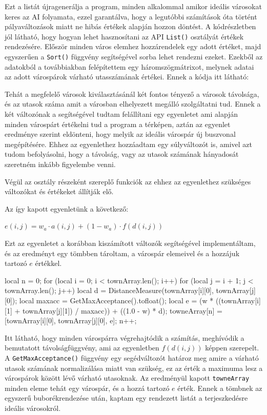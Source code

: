 Ezt a listát újragenerálja a program, minden alkalommal amikor ideális városokat keres az AI folyamata, ezzel garantálva, hogy a legutóbbi számítások óta történt pályaváltozások miatt ne hibás értékek alapján hozzon döntést. A kódrészletben jól látható, hogy hogyan lehet hasznosítani az API \texttt{List()} osztályát értékek rendezésére. Először minden város elemhez hozzárendelek egy adott értéket, majd egyszerűen a \texttt{Sort()} függvény segítségével sorba lehet rendezni ezeket. Ezekből az adatokból a továbbiakban felépítettem egy háromszögmátrixot, melynek adatai az adott várospárok várható utasszámának értékei. Ennek a kódja itt látható:

Tehát a megfelelő városok kiválasztásánál két fontos tényező a városok távolsága, és az utasok száma amit a városban elhelyezett megálló szolgáltatni tud. Ennek a két változónak a segítségével tudtam felállítani egy egyenletet ami alapján minden várospárt értékelni tud a program a térképen, aztán az egyenlet eredménye szerint eldönteni, hogy melyik az ideális várospár új buszvonal megépítésére. Ehhez az egyenlethez hozzáadtam egy súlyváltozót is, amivel azt tudom befolyásolni, hogy a távolság, vagy az utasok számának hányadosát szeretném inkább figyelembe venni.

Végül az osztály részeként szereplő funkciók az ehhez az egyenlethez szükséges változókat és értékeket állítják elő.

Az így kapott egyenletünk a következő:
\begin{center}
	$ e(i,j)=w_{a} \cdot a(i,j)+(1-w_{a}) \cdot f(d(i,j)) $
\end{center}

Ezt az egyenletet a korábban kiszámított változók segítségével implementáltam, és az eredményt egy tömbben tároltam, a várospár elemeivel és a hozzájuk tartozó $e$ értékkel.

\begin{cpp}
local n = 0;
for (local i = 0; i < townArray.len(); i++) {
  for (local j = i + 1; j < townArray.len(); j++) {
    local d = DistanceMeasure(townArray[i][0], townArray[j][0]);
    local maxacc = GetMaxAcceptance().tofloat();
    local e = (w * ((townArray[i][1] + townArray[j][1]) / maxacc))
      + ((1.0 - w) * d);
    towneArray[n] = [townArray[i][0], townArray[j][0], e];
    n++;
  }
}
\end{cpp}

Itt látható, hogy minden várospárra végrehajtódik a számítás, meghívódik a bemutatott távolságfüggvény, ami az egyenletben $f(d(i,j))$ képpen szerepelt. \\ A \texttt{GetMaxAcceptance()} függvény egy segédváltozót határoz meg amire a várható utasok számának normalizálása miatt van szükség, ez az érték a maximuma lesz a várospárok között lévő várható utasoknak. Az eredményül kapott \texttt{towneArray} minden eleme tehát egy várospár, és a hozzá tartozó $e$ érték. Ennek a tömbnek az egyszerű buborékrendezése után, kaptam egy rendezett listát a terjeszkedésre ideális városokról.

